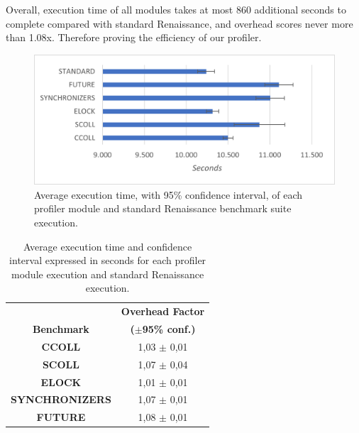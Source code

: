 \documentclass[]{usiinfthesis}
\begin{document}
Overall, execution time of all modules takes at most 860 additional seconds to complete compared with standard Renaissance, and overhead scores never more than 1.08x. Therefore proving the efficiency of our profiler.


\begin{figure}
    \centering
    \includegraphics[scale=1]{Immagini/executiontime.png} 
    \caption{Average execution time, with 95\% confidence interval, of each profiler module and standard Renaissance benchmark suite execution.}
    \label{fig:fig1}
\end{figure}


\begin{table}
\centering
\caption{Average execution time and confidence interval expressed in seconds for each profiler module execution and standard Renaissance execution.}
\begin{tabular}{|c|c|}
\hline
		 & 	\textbf{	Overhead Factor	}		\\	
\textbf{	Benchmark	}&	\textbf{	 ($\pm$95\% conf.) 	}		\\	 \hline 
\textbf{	CCOLL	}&	 1,03 	$\pm$		 0,01 	\\	
\textbf{	SCOLL	}&	 1,07 	$\pm$		 0,04 	\\	
\textbf{	ELOCK	}&	 1,01 	$\pm$		 0,01 	\\	
\textbf{	SYNCHRONIZERS	}&	 1,07 	$\pm$		 0,01 	\\	
\textbf{	FUTURE	}&	 1,08 	$\pm$		 0,01 	\\	
\hline
\end{tabular}
\end{table}%
\end{document}

